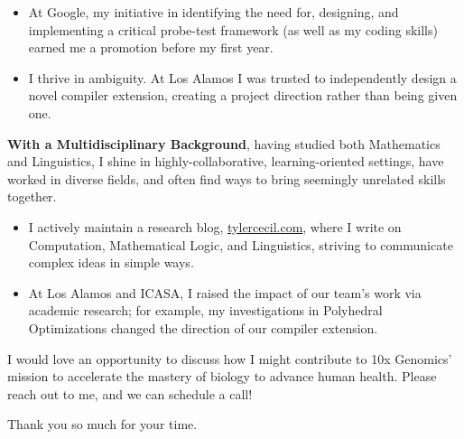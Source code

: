\documentclass[sans, a4paper, 11pt]{article}
\newcommand{\cvcolor}[1]{{\color{MidnightBlue}#1}}
\renewcommand{\hl}[1]{\cvcolor{\textbf{#1}}}
\begin{document}
\begin{adjustwidth}{40pt}{40pt}
\begin{itemize}
  \begin{itemize}

    \item At Google, my initiative in identifying the need for, designing, and
      implementing a critical probe-test framework (as well as my coding
      skills) earned me a promotion before my first year.

    \item I thrive in ambiguity. At Los Alamos I was trusted to independently
      design a novel compiler extension, creating a project direction rather
      than being given one.


  \end{itemize}\smallskip


  \hl{With a Multidisciplinary Background}, having studied both Mathematics and
  Linguistics, I shine in highly-collaborative, learning-oriented settings,
  have worked in diverse fields, and often find ways to bring seemingly
  unrelated skills together.\smallskip

  \begin{itemize}

    \item I actively maintain a research blog, \url{tylercecil.com}, where I
      write on Computation, Mathematical Logic, and Linguistics, striving to
      communicate complex ideas in simple ways.

    \item At Los Alamos and ICASA, I raised the impact of our team's work via
      academic research; for example, my investigations in Polyhedral
      Optimizations changed the direction of our compiler extension.

  \end{itemize} \medskip

  I would love an opportunity to discuss how I might contribute to 10x
  Genomics' mission to accelerate the mastery of biology to advance human
  health. Please reach out to me, and we can schedule a call!  \bigskip

  Thank you so much for your time.


\end{itemize}
\end{adjustwidth}
\end{document}
